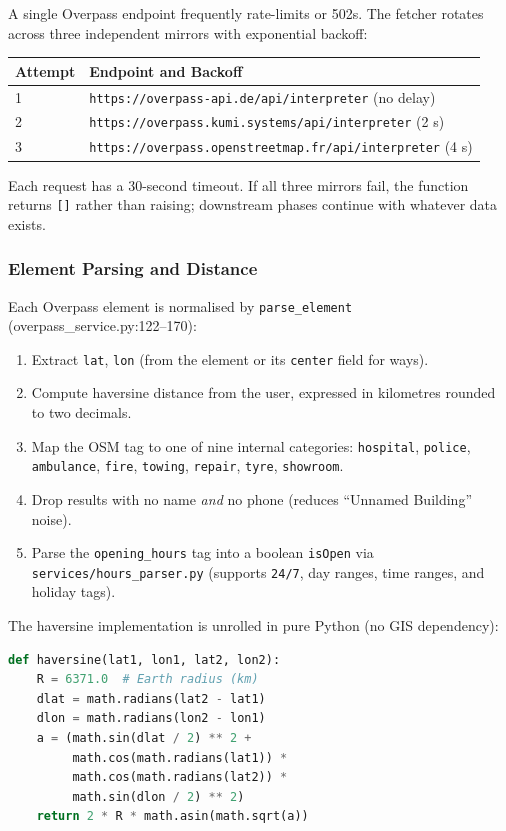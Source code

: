 \documentclass[11pt, a4paper]{article}
\newcommand{\file}[1]{\texttt{\small\color{rsblue}#1}}
\newcommand{\code}[1]{\texttt{\small#1}}
\begin{document}
A single Overpass endpoint frequently rate-limits or 502s. The fetcher rotates across three independent mirrors with exponential backoff:

\begin{tabularx}{\textwidth}{l X}
\toprule
\textbf{Attempt} & \textbf{Endpoint and Backoff} \\
\midrule
1 & \code{https://overpass-api.de/api/interpreter} (no delay) \\
2 & \code{https://overpass.kumi.systems/api/interpreter} (2 s) \\
3 & \code{https://overpass.openstreetmap.fr/api/interpreter} (4 s) \\
\bottomrule
\end{tabularx}

Each request has a 30-second timeout. If all three mirrors fail, the function returns \code{[]} rather than raising; downstream phases continue with whatever data exists.

\subsubsection{Element Parsing and Distance}

Each Overpass element is normalised by \code{parse\_element} (overpass\_service.py:122--170):

\begin{enumerate}[leftmargin=*, itemsep=2pt, topsep=2pt]
  \item Extract \code{lat}, \code{lon} (from the element or its \code{center} field for ways).
  \item Compute haversine distance from the user, expressed in kilometres rounded to two decimals.
  \item Map the OSM tag to one of nine internal categories: \texttt{hospital}, \texttt{police}, \texttt{ambulance}, \texttt{fire}, \texttt{towing}, \texttt{repair}, \texttt{tyre}, \texttt{showroom}.
  \item Drop results with no name \emph{and} no phone (reduces ``Unnamed Building'' noise).
  \item Parse the \code{opening\_hours} tag into a boolean \code{isOpen} via \file{services/hours\_parser.py} (supports \code{24/7}, day ranges, time ranges, and holiday tags).
\end{enumerate}

The haversine implementation is unrolled in pure Python (no GIS dependency):

\begin{lstlisting}[language=Python,caption={overpass\_service.py:66--78}]
def haversine(lat1, lon1, lat2, lon2):
    R = 6371.0  # Earth radius (km)
    dlat = math.radians(lat2 - lat1)
    dlon = math.radians(lon2 - lon1)
    a = (math.sin(dlat / 2) ** 2 +
         math.cos(math.radians(lat1)) *
         math.cos(math.radians(lat2)) *
         math.sin(dlon / 2) ** 2)
    return 2 * R * math.asin(math.sqrt(a))
\end{lstlisting}
\end{document}
